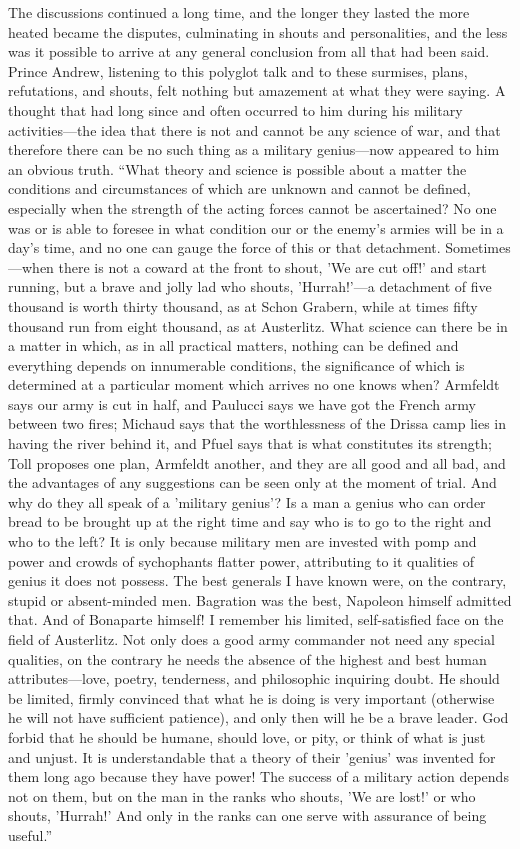 The discussions continued a long time, and the longer they lasted
the more heated became the disputes, culminating in shouts and
personalities, and the less was it possible to arrive at any
general conclusion from all that had been said. Prince Andrew,
listening to this polyglot talk and to these surmises, plans,
refutations, and shouts, felt nothing but amazement at what they
were saying. A thought that had long since and often occurred to
him during his military activities---the idea that there is not
and cannot be any science of war, and that therefore there can be
no such thing as a military genius---now appeared to him an
obvious truth. ``What theory and science is possible about a
matter the conditions and circumstances of which are unknown and
cannot be defined, especially when the strength of the acting
forces cannot be ascertained? No one was or is able to foresee in
what condition our or the enemy's armies will be in a day's time,
and no one can gauge the force of this or that
detachment. Sometimes---when there is not a coward at the front
to shout, 'We are cut off!' and start running, but a brave and
jolly lad who shouts, 'Hurrah!'---a detachment of five thousand
is worth thirty thousand, as at Schon Grabern, while at times
fifty thousand run from eight thousand, as at Austerlitz. What
science can there be in a matter in which, as in all practical
matters, nothing can be defined and everything depends on
innumerable conditions, the significance of which is determined
at a particular moment which arrives no one knows when? Armfeldt
says our army is cut in half, and Paulucci says we have got the
French army between two fires; Michaud says that the
worthlessness of the Drissa camp lies in having the river behind
it, and Pfuel says that is what constitutes its strength; Toll
proposes one plan, Armfeldt another, and they are all good and
all bad, and the advantages of any suggestions can be seen only
at the moment of trial.  And why do they all speak of a 'military
genius'? Is a man a genius who can order bread to be brought up
at the right time and say who is to go to the right and who to
the left? It is only because military men are invested with pomp
and power and crowds of sychophants flatter power, attributing to
it qualities of genius it does not possess. The best generals I
have known were, on the contrary, stupid or absent-minded
men. Bagration was the best, Napoleon himself admitted that. And
of Bonaparte himself! I remember his limited, self-satisfied face
on the field of Austerlitz. Not only does a good army commander
not need any special qualities, on the contrary he needs the
absence of the highest and best human attributes---love, poetry,
tenderness, and philosophic inquiring doubt. He should be
limited, firmly convinced that what he is doing is very important
(otherwise he will not have sufficient patience), and only then
will he be a brave leader. God forbid that he should be humane,
should love, or pity, or think of what is just and unjust. It is
understandable that a theory of their 'genius' was invented for
them long ago because they have power! The success of a military
action depends not on them, but on the man in the ranks who
shouts, 'We are lost!' or who shouts, 'Hurrah!' And only in the
ranks can one serve with assurance of being useful.''


